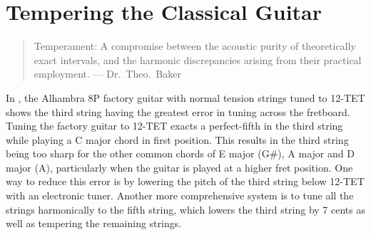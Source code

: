 %
%
%

 \section{Tempering the Classical Guitar\label{sct:temp}}

 \begin{quote}
 Temperament: A compromise between the acoustic purity of theoretically exact intervals, and the harmonic discrepancies arising from their practical employment. --- Dr.\ Theo.\ Baker~\cite{ref:baker1895dmt}
 \end{quote}

In , the Alhambra 8P factory guitar with normal tension strings tuned to 12-TET shows the third string having the greatest error in tuning across the fretboard. Tuning the factory guitar to 12-TET exacts a perfect-fifth in the third string while playing a C major chord in first position. This results in the third string being too sharp for the other common chords of E major (G\#), A major and D major (A), particularly when the guitar is played at a higher fret position. One way to reduce this error is by lowering the pitch of the third string below 12-TET with an electronic tuner. Another more comprehensive system is to tune all the strings harmonically to the fifth string, which lowers the third string by 7 cents as well as tempering the remaining strings.

